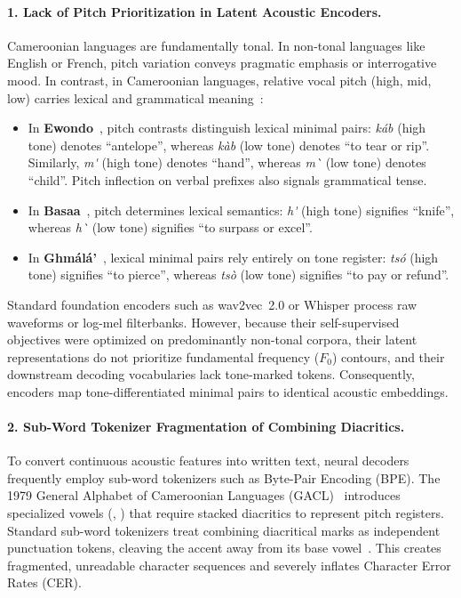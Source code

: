 \documentclass[a4paper,11pt]{article}
\begin{document}
\paragraph{1. Lack of Pitch Prioritization in Latent Acoustic Encoders.}
Cameroonian languages are fundamentally tonal. In non-tonal languages like English or French, pitch variation conveys pragmatic emphasis or interrogative mood. In contrast, in Cameroonian languages, relative vocal pitch (high, mid, low) carries lexical and grammatical meaning~\cite{essono2000ewondo, lemb1973dictionnaire, sadembouo1984systematique, watters2003grassfields}:
\begin{itemize}
    \item In \textbf{Ewondo}~\cite{essono2000ewondo}, pitch contrasts distinguish lexical minimal pairs: \textit{k\'ab} (high tone) denotes ``antelope'', whereas \textit{k\`ab} (low tone) denotes ``to tear or rip''. Similarly, \textit{m\'\textopeno} (high tone) denotes ``hand'', whereas \textit{m\`\textopeno} (low tone) denotes ``child''. Pitch inflection on verbal prefixes also signals grammatical tense.
    \item In \textbf{Basaa}~\cite{lemb1973dictionnaire}, pitch determines lexical semantics: \textit{h\'\textepsilon} (high tone) signifies ``knife'', whereas \textit{h\`\textepsilon} (low tone) signifies ``to surpass or excel''.
    \item In \textbf{Gh\textopeno m\'al\'a'}~\cite{sadembouo1984systematique, watters2003grassfields}, lexical minimal pairs rely entirely on tone register: \textit{ts\'o} (high tone) signifies ``to pierce'', whereas \textit{ts\`o} (low tone) signifies ``to pay or refund''.
\end{itemize}
Standard foundation encoders such as wav2vec~2.0 or Whisper process raw waveforms or log-mel filterbanks. However, because their self-supervised objectives were optimized on predominantly non-tonal corpora, their latent representations do not prioritize fundamental frequency ($F_0$) contours, and their downstream decoding vocabularies lack tone-marked tokens. Consequently, encoders map tone-differentiated minimal pairs to identical acoustic embeddings.

\paragraph{2. Sub-Word Tokenizer Fragmentation of Combining Diacritics.}
To convert continuous acoustic features into written text, neural decoders frequently employ sub-word tokenizers such as Byte-Pair Encoding (BPE). The 1979 General Alphabet of Cameroonian Languages (GACL)~\cite{tadadjeu1979alphabet} introduces specialized vowels (\textopeno, \textschwa) that require stacked diacritics to represent pitch registers. Standard sub-word tokenizers treat combining diacritical marks as independent punctuation tokens, cleaving the accent away from its base vowel~\cite{joshi2020state}. This creates fragmented, unreadable character sequences and severely inflates Character Error Rates (CER).
\end{document}
